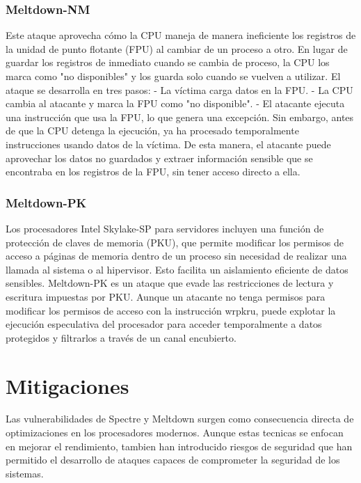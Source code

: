 \documentclass[lettersize,compsoc]{IEEEtran}
\begin{document}
\subsubsection{\textbf{Meltdown-NM}}
Este ataque aprovecha cómo la CPU maneja de manera ineficiente los registros de la unidad de punto flotante (FPU) al cambiar de un proceso a otro. En lugar de guardar los registros de inmediato cuando se cambia de proceso, la CPU los marca como "no disponibles" y los guarda solo cuando se vuelven a utilizar.
\newline
El ataque se desarrolla en tres pasos:
- La víctima carga datos en la FPU.
- La CPU cambia al atacante y marca la FPU como "no disponible".
- El atacante ejecuta una instrucción que usa la FPU, lo que genera una excepción. Sin embargo, antes de que la CPU detenga la ejecución, ya ha procesado temporalmente instrucciones usando datos de la víctima.
\newline De esta manera, el atacante puede aprovechar los datos no guardados y extraer información sensible que se encontraba en los registros de la FPU, sin tener acceso directo a ella.
\subsubsection{\textbf{Meltdown-PK}}
Los procesadores Intel Skylake-SP para servidores incluyen una función de protección de claves de memoria (PKU), que permite modificar los permisos de acceso a páginas de memoria dentro de un proceso sin necesidad de realizar una llamada al sistema o al hipervisor. Esto facilita un aislamiento eficiente de datos sensibles.
\newline Meltdown-PK es un ataque que evade las restricciones de lectura y escritura impuestas por PKU. Aunque un atacante no tenga permisos para modificar los permisos de acceso con la instrucción wrpkru, puede explotar la ejecución especulativa del procesador para acceder temporalmente a datos protegidos y filtrarlos a través de un canal encubierto.

\section{Mitigaciones}
Las vulnerabilidades de Spectre y Meltdown surgen como consecuencia directa de optimizaciones en los procesadores modernos. Aunque estas tecnicas se enfocan en mejorar el rendimiento, tambien han introducido riesgos de seguridad que han permitido el desarrollo de ataques capaces de comprometer la seguridad de los sistemas.
\end{document}
